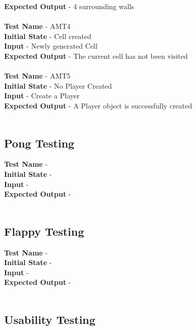 \documentclass[12pt, titlepage]{article}
\begin{document}
\textbf{Expected Output} - 4 surrounding walls\\ \\
\textbf{Test Name} - AMT4\\
\textbf{Initial State} - Cell created\\
\textbf{Input} - Newly generated Cell\\
\textbf{Expected Output} - The current cell has not been visited\\ \\
\textbf{Test Name} - AMT5\\
\textbf{Initial State} - No Player Created\\
\textbf{Input} - Create a Player\\ 
\textbf{Expected Output} - A Player object is successfully created\\ \\

\subsection{Pong Testing}

\textbf{Test Name} - \\
\textbf{Initial State} - \\
\textbf{Input} - \\
\textbf{Expected Output} - \\ \\ 

\subsection{Flappy Testing}

\textbf{Test Name} - \\
\textbf{Initial State} - \\
\textbf{Input} - \\
\textbf{Expected Output} - \\ \\ 

\subsection{Usability Testing}
\end{document}
